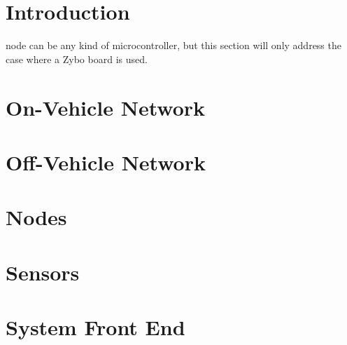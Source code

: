 \section{Introduction}
 node can be any kind of microcontroller, but this section will only address the case where a Zybo board is used. 

\section{On-Vehicle Network}






\section{Off-Vehicle Network}
\label{sec:wifi}

\section{Nodes}

\section{Sensors}

\section{System Front End}
